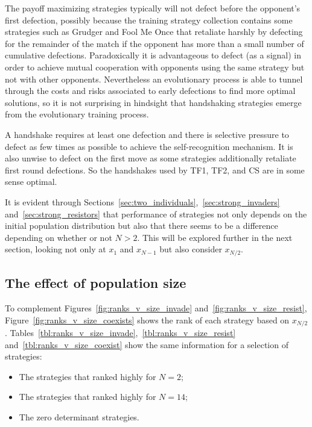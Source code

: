 \documentclass{article}
\begin{document}
The payoff maximizing strategies typically will not defect before the opponent's
first defection, possibly because the training strategy collection contains some
strategies such as Grudger and Fool Me Once that retaliate harshly by defecting
for the remainder of the match if the opponent has more than a small number of
cumulative defections. Paradoxically it is advantageous to defect (as a signal)
in order to achieve mutual cooperation with opponents using the same strategy
but not with other opponents. Nevertheless an evolutionary process is able to
tunnel through the costs and risks associated to early defections to find more
optimal solutions, so it is not surprising in hindsight that handshaking
strategies emerge from the evolutionary training process.

A handshake requires at least one defection and there is
selective pressure to defect as few times as possible to achieve the
self-recognition mechanism. It is also unwise to defect on the first move as
some strategies additionally retaliate first round defections. So the
handshakes used by TF1, TF2, and CS are in some sense optimal.

It is evident through
Sections~\ref{sec:two_individuals},~\ref{sec:strong_invaders}
and~\ref{sec:strong_resistors} that performance of strategies not only depends
on the initial population distribution but also that there seems to be a
difference depending on whether or not \(N>2\). This will be explored further in
the next section, looking not only at \(x_1\) and \(x_{N-1}\) but also consider
\(x_{N/2}\).

\subsection{The effect of population size}\label{sec:population_size}

To complement Figures~\ref{fig:ranks_v_size_invade} and~\ref{fig:ranks_v_size_resist}, Figure~\ref{fig:ranks_v_size_coexists} shows the rank of each strategy based on \(x_{N/2}\).
Tables~\ref{tbl:ranks_v_size_invade},~\ref{tbl:ranks_v_size_resist}
and~\ref{tbl:ranks_v_size_coexist} show the same information for a selection of
strategies:

\begin{itemize}
    \item The strategies that ranked highly for \(N=2\);
    \item The strategies that ranked highly for \(N=14\);
    \item The zero determinant strategies.
\end{itemize}
\end{document}
